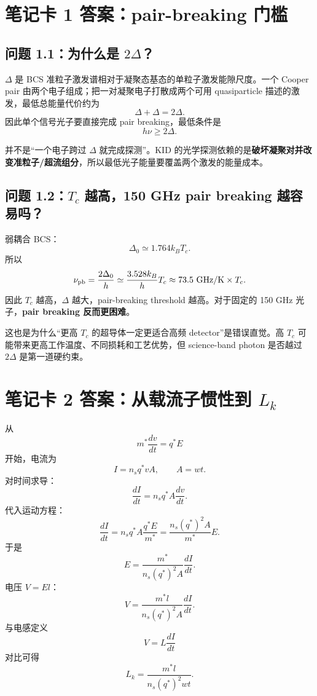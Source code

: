 \documentclass[11pt,a4paper,openany]{ctexrep}
\begin{document}
\section{笔记卡 1 答案：pair-breaking 门槛}

\subsection*{问题 1.1：为什么是 $2\Delta$？}

$\Delta$ 是 BCS 准粒子激发谱相对于凝聚态基态的单粒子激发能隙尺度。一个 Cooper pair 由两个电子组成；把一对凝聚电子打散成两个可用 quasiparticle 描述的激发，最低总能量代价约为
\[
\Delta+\Delta=2\Delta.
\]
因此单个信号光子要直接完成 pair breaking，最低条件是
\[
h\nu\ge 2\Delta.
\]

\begin{answerbox}[title=物理图景]
并不是“一个电子跨过 $\Delta$ 就完成探测”。KID 的光学探测依赖的是\textbf{破坏凝聚对并改变准粒子/超流组分}，所以最低光子能量要覆盖两个激发的能量成本。
\end{answerbox}

\subsection*{问题 1.2：$T_c$ 越高，150 GHz pair breaking 越容易吗？}

弱耦合 BCS：
\[
\Delta_0\simeq1.764k_B T_c.
\]
所以
\[
\nu_{\rm pb}=\frac{2\Delta_0}{h}
\simeq\frac{3.528k_B}{h}T_c
\approx73.5\ \mathrm{GHz/K}\times T_c.
\]
因此 $T_c$ 越高，$\Delta$ 越大，pair-breaking threshold 越高。对于固定的 150 GHz 光子，\textbf{pair breaking 反而更困难}。

这也是为什么“更高 $T_c$ 的超导体一定更适合高频 detector”是错误直觉。高 $T_c$ 可能带来更高工作温度、不同损耗和工艺优势，但 science-band photon 是否越过 $2\Delta$ 是第一道硬约束。

\section{笔记卡 2 答案：从载流子惯性到 $L_k$}

从
\[
m^*\frac{dv}{dt}=q^*E
\]
开始，电流为
\[
I=n_s q^* v A,
\qquad A=wt.
\]
对时间求导：
\[
\frac{dI}{dt}=n_s q^* A\frac{dv}{dt}.
\]
代入运动方程：
\[
\frac{dI}{dt}
=n_s q^*A\frac{q^*E}{m^*}
=\frac{n_s(q^*)^2A}{m^*}E.
\]
于是
\[
E=\frac{m^*}{n_s(q^*)^2A}\frac{dI}{dt}.
\]
电压 $V=El$：
\[
V=\frac{m^*l}{n_s(q^*)^2A}\frac{dI}{dt}.
\]
与电感定义
\[
V=L\frac{dI}{dt}
\]
对比可得
\[
\boxed{
L_k=\frac{m^*l}{n_s(q^*)^2wt}
}.
\]
\end{document}
